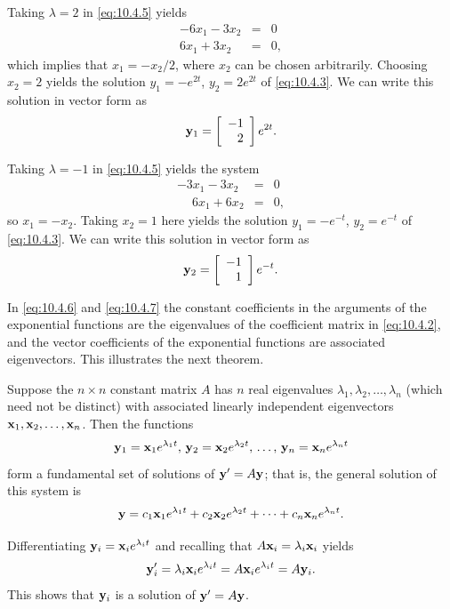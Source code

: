 Taking $\lambda=2$ in \eqref{eq:10.4.5} yields
\begin{eqnarray*}
  -6x_{1}-3x_{2} & = & 0 \\
  6x_{1}+3x_{2}  & = & 0,
\end{eqnarray*}
which implies that $x_{1}=-x_{2}/2$, where $x_{2}$ can be chosen arbitrarily. Choosing $x_{2}=2$
yields the solution $y_{1}=-e^{2t}$, $y_{2}=2e^{2t}$ of \eqref{eq:10.4.3}. We can write this
solution in vector form as
\begin{equation}
  \label{eq:10.4.6}{\bf y}_{1}=\left[\begin{array}{l}-1\\\phantom{-}2\end{array}\right]e^{2t}.
\end{equation}

Taking $\lambda=-1$ in \eqref{eq:10.4.5} yields the system
\begin{eqnarray*}
  -3x_{1}-3x_{2}           & = & 0 \\
  \phantom{-}6x_{1}+6x_{2} & = & 0,
\end{eqnarray*}
so $x_{1}=-x_{2}$. Taking $x_{2}=1$ here yields the solution $y_{1}=-e^{-t}$, $y_{2}=e^{-t}$ of
\eqref{eq:10.4.3}. We can write this solution in vector form as
\begin{equation}
  \label{eq:10.4.7}{\bf y}_{2}=\left[\begin{array}{l}-1\\\phantom{-}1\end{array}\right]e^{-t}.
\end{equation}

In \eqref{eq:10.4.6} and \eqref{eq:10.4.7} the constant coefficients in the arguments of the
exponential functions are the eigenvalues of the coefficient matrix in \eqref{eq:10.4.2}, and the
vector coefficients of the exponential functions are associated eigenvectors. This illustrates the
next theorem.

\begin{theorem}
  \color{blue}
  \label{thmtype:10.4.1} Suppose the $n\times n$ constant matrix $A$ has $n$ real eigenvalues
  $\lambda_{1},\lambda_{2},\ldots,\lambda_{n}$ {\rm(}which need not be distinct{\rm)} with
  associated linearly independent eigenvectors ${\bf x}_{1},{\bf x}_{2},\ldots,{\bf x}_{n}$. Then
  the functions
  \[
    {\bf y}_{1}={\bf x}_{1}e^{\lambda_{1}t},\,{\bf y}_{2}={\bf x}_{2}e^{\lambda_{2}t},\, \dots,\,{\bf y}_{n}={\bf x}_{n}e^{\lambda_{n}t}
  \]
  form a fundamental set of solutions of ${\bf y}'=A{\bf y}$; that is, the general solution of this
  system is
  \[
    {\bf y}=c_{1}{\bf x}_{1}e^{\lambda_{1}t}+c_{2}{\bf x}_{2}e^{\lambda_{2}t}+\cdots+c_{n}{\bf x}_{n}e^{\lambda_{n}t}.
  \]
\end{theorem}

\proof Differentiating ${\bf y}_{i}={\bf x}_{i}e^{\lambda_{i}t}$ and recalling that
$A{\bf x}_{i}=\lambda_{i}{\bf x}_{i}$ yields
\[
  {\bf y}_{i}'=\lambda_{i}{\bf x}_{i}e^{\lambda_{i}t}=A{\bf x}_{i}e^{\lambda_{i}t}=A{\bf y}_{i}.
\]
This shows that ${\bf y}_{i}$ is a solution of ${\bf y}'=A{\bf y}$.

